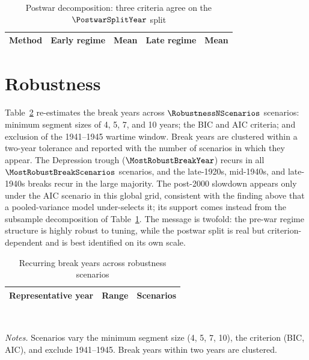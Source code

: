 \documentclass[11pt]{article}
\begin{document}
\begin{table}[H]
  \centering
  \caption{Postwar decomposition: three criteria agree on the
  $\PostwarSplitYear$ split}
  \label{tab:postwar}
  \begin{tabular}{lcccc}
    \toprule
    Method & Early regime & Mean & Late regime & Mean \\
    \midrule
    
  \end{tabular}
\end{table}

\section{Robustness}
\label{sec:robustness}

Table~\ref{tab:robustness} re-estimates the break years across
$\RobustnessNScenarios$ scenarios: minimum segment sizes of 4, 5, 7, and 10
years; the BIC and AIC criteria; and exclusion of the 1941--1945 wartime window.
Break years are clustered within a two-year tolerance and reported with the
number of scenarios in which they appear. The Depression trough
($\MostRobustBreakYear$) recurs in all $\MostRobustBreakScenarios$ scenarios, and
the late-1920s, mid-1940s, and late-1940s breaks recur in the large majority. The
post-2000 slowdown appears only under the AIC scenario in this global grid,
consistent with the finding above that a pooled-variance model under-selects it;
its support comes instead from the subsample decomposition of
Table~\ref{tab:postwar}. The message is twofold: the pre-war regime structure is
highly robust to tuning, while the postwar split is real but criterion-dependent
and is best identified on its own scale.

\begin{table}[H]
  \centering
  \caption{Recurring break years across robustness scenarios}
  \label{tab:robustness}
  \begin{tabular}{ccc}
    \toprule
    Representative year & Range & Scenarios \\
    \midrule
    
  \end{tabular}
  \\[0.4em]
  {\footnotesize\begin{minipage}{0.78\linewidth}
  \textit{Notes.} Scenarios vary the minimum segment size (4, 5, 7, 10), the
  criterion (BIC, AIC), and exclude 1941--1945. Break years within two years are
  clustered.
  \end{minipage}}
\end{table}
\end{document}
